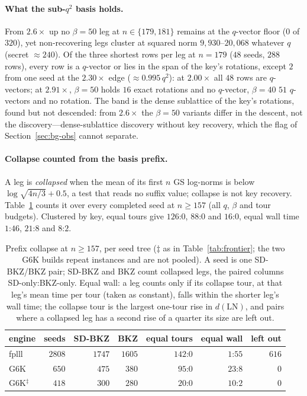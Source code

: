 \documentclass[journal=cic,version=preprint]{iacrj}
\begin{document}
\paragraph{What the sub-$q^2$ basis holds.}
From $2.6\times$ up no $\beta=50$ leg at $n\in\{179,181\}$ remains at the
$q$-vector floor ($0$ of $320$), yet non-recovering legs cluster at squared
norm $9{,}930$--$20{,}068$ whatever $q$ (secret ${\approx}240$). Of the
three shortest rows per leg at $n=179$ ($48$ seeds, $288$ rows), every row
is a $q$-vector or lies in the span of the key's rotations, except $2$ from
one seed at the $2.30\times$ edge (${\approx}0.995\,q^2$): at $2.00\times$
all $48$ rows are $q$-vectors; at $2.91\times$, $\beta=50$ holds
$16$ exact rotations and no $q$-vector, $\beta=40$ $51$ $q$-vectors and no
rotation. The band is the dense sublattice of the key's rotations, found but
not descended: from $2.6\times$ the $\beta=50$ variants differ in the descent, not
the discovery---dense-sublattice discovery without key recovery, which the flag
of Section~\ref{sec:bg-obs} cannot separate.

\paragraph{Collapse counted from the basis prefix.}
A leg is \emph{collapsed} when the mean of its first $n$ GS log-norms is
below $\log\sqrt{4n/3}+0.5$, a test that reads no suffix value; collapse is
not key recovery. Table~\ref{tab:prefix} counts it over every completed
seed at $n\ge157$ (all $q$, $\beta$ and tour budgets). Clustered by key,
equal tours give $126$:$0$, $88$:$0$ and $16$:$0$,
equal wall time $1$:$46$, $21$:$8$ and $8$:$2$.

\begin{table}[tbp]
\centering
\caption{Prefix collapse at $n\ge157$, per seed tree ($\ddagger$ as in
Table~\ref{tab:frontier}; the two G6K builds repeat instances and are not
pooled). A seed is one SD-BKZ/BKZ pair; SD-BKZ and BKZ count collapsed legs,
the paired columns SD-only:BKZ-only. Equal wall: a leg counts only if its
collapse tour, at that leg's mean time per tour (taken as constant), falls
within the shorter leg's wall time; the collapse tour is the largest
one-tour rise in $d(\mathrm{LN})$, and pairs where a collapsed leg has a
second rise of a quarter its size are left out.\label{tab:prefix}}
\small
\begin{tabular}{lrrrrrr}
\toprule
engine & seeds & SD-BKZ & BKZ & equal tours & equal wall & left out \\
\midrule
fplll & $2808$ & $1747$ & $1605$ & $142$:$0$ & $1$:$55$ & $616$ \\
G6K & $650$ & $475$ & $380$ & $95$:$0$ & $23$:$8$ & $0$ \\
G6K$^\ddagger$ & $418$ & $300$ & $280$ & $20$:$0$ & $10$:$2$ & $0$ \\
\bottomrule
\end{tabular}
\end{table}
\end{document}
